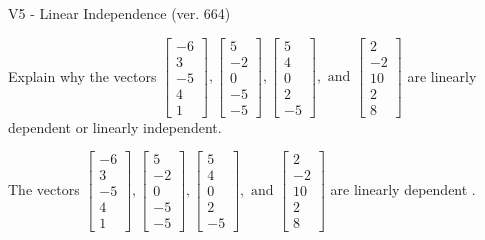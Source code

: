\begin{exercise}
  \begin{exerciseTitle}V5 - Linear Independence (ver. 664)\end{exerciseTitle}
  \begin{exerciseStatement}
    Explain why the vectors \(\left[\begin{array}{r}
-6 \\
3 \\
-5 \\
4 \\
1
\end{array}\right] , \left[\begin{array}{r}
5 \\
-2 \\
0 \\
-5 \\
-5
\end{array}\right] , \left[\begin{array}{r}
5 \\
4 \\
0 \\
2 \\
-5
\end{array}\right] , \text{ and } \left[\begin{array}{r}
2 \\
-2 \\
10 \\
2 \\
8
\end{array}\right]\) are linearly dependent or linearly independent.	


  \end{exerciseStatement}
  \begin{exerciseAnswer}
   The vectors \(\left[\begin{array}{r}
-6 \\
3 \\
-5 \\
4 \\
1
\end{array}\right] , \left[\begin{array}{r}
5 \\
-2 \\
0 \\
-5 \\
-5
\end{array}\right] , \left[\begin{array}{r}
5 \\
4 \\
0 \\
2 \\
-5
\end{array}\right] , \text{ and } \left[\begin{array}{r}
2 \\
-2 \\
10 \\
2 \\
8
\end{array}\right]\) are 
  	 linearly dependent  .
  


  \end{exerciseAnswer}
\end{exercise}